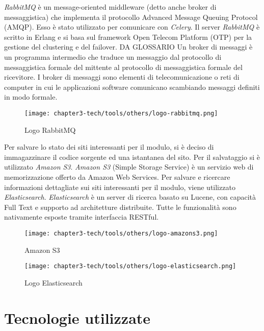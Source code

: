 \textit{RabbitMQ} è un message-oriented middleware (detto anche broker di messaggistica) che implementa il protocollo Advanced Message Queuing Protocol (AMQP). Esso è stato utilizzato per comunicare con \textit{Celery}. Il server \textit{RabbitMQ} è scritto in Erlang e si basa sul framework Open Telecom Platform (OTP) per la gestione del clustering e del failover. DA GLOSSARIO Un broker di messaggi è un programma intermedio che traduce un messaggio dal protocollo di messaggistica formale del mittente al protocollo di messaggistica formale del ricevitore. I broker di messaggi sono elementi di telecomunicazione o reti di computer in cui le applicazioni software comunicano scambiando messaggi definiti in modo formale. 
\begin{figure}[!h] 
    \centering 
    \texttt{[image: chapter3-tech/tools/others/logo-rabbitmq.png]} 
    \caption{Logo RabbitMQ}
    \label{fig:rabbitmq} 
\end{figure}

Per salvare lo stato dei siti interessanti per il modulo, si è deciso di immagazzinare il codice sorgente ed una istantanea del sito. Per il salvataggio si è utilizzato \textit{Amazon S3}. \textit{Amazon S3} (Simple Storage Service) è un servizio web di memorizzazione offerto da Amazon Web Services.\newline{} Per salvare e ricercare informazioni dettagliate sui siti interessanti per il modulo, viene utilizzato \textit{Elasticsearch}. \textit{Elasticsearch} è un server di ricerca basato su Lucene, con capacità Full Text e supporto ad architetture distribuite. Tutte le funzionalità sono nativamente esposte tramite interfaccia RESTful.
\begin{figure}[!h]
    \begin{minipage}{.5\textwidth} 
        \centering 
        \texttt{[image: chapter3-tech/tools/others/logo-amazons3.png]} 
        \caption{Amazon S3} 
        \label{fig:amazons3} 
    \end{minipage}%
    \begin{minipage}{.5\textwidth} 
        \centering 
        \texttt{[image: chapter3-tech/tools/others/logo-elasticsearch.png]} 
        \caption{Logo Elasticsearch} 
        \label{fig:elasticsearch} 
    \end{minipage}%
\end{figure} 

\section{Tecnologie utilizzate}

